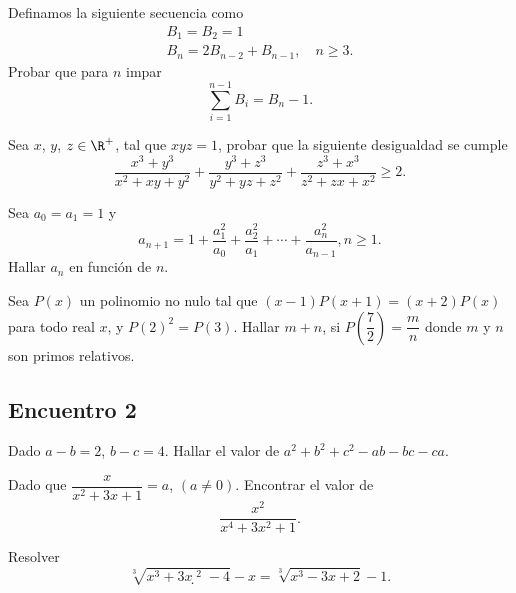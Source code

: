 \begin{section-problem}
    Definamos la siguiente secuencia como
    \begin{gather*}
        B_1 = B_2 = 1\\
        B_n = 2 B_{n - 2} + B_{n - 1}, \quad n \geq 3.
    \end{gather*}
    Probar que para $n$ impar
    \[\sum_{i = 1}^{n - 1} B_i = B_n - 1.\]
\end{section-problem}

\begin{section-problem}
    Sea $x$, $y$, $z \in \R^+$, tal que $xyz = 1$, probar que la siguiente desigualdad se cumple
    \[\frac{x^3 + y^3}{x^2 + xy + y^2} + \frac{y^3 + z^3}{y^2 + yz + z^2} + \frac{z^3 + x^3}{z^2 + zx + x^2} \geq 2.\]
\end{section-problem}

\begin{section-problem}
    Sea $a_0 = a_1 = 1$ y
    \[a_{n + 1} = 1 + \frac{a^2_1}{a_0} + \frac{a^2_2}{a_1} + \cdots + \frac{a^2_n}{a_{n - 1}}, n \geq 1.\]
    Hallar $a_n$ en función de $n$.
\end{section-problem}

\begin{section-problem}
    Sea $P(x)$ un polinomio no nulo tal que $(x - 1)P(x + 1) = (x + 2)P(x)$ para todo real $x$, y $P(2)^2 = P(3)$.
    Hallar $m + n$, si $P\left(\dfrac{7}{2}\right) = \dfrac{m}{n}$ donde $m$ y $n$ son primos relativos.
\end{section-problem}





\subsection{Encuentro 2}

\begin{section-problem}
    Dado $a - b = 2$, $b - c = 4$.
    Hallar el valor de $a^2 + b^2 + c^2 - ab - bc - ca$.
\end{section-problem}

\begin{section-problem}
    Dado que $\dfrac{x}{x^2 + 3x + 1} = a$, $(a \neq 0)$.
    Encontrar el valor de
    \[\frac{x^2}{x^4 + 3x^2 + 1}.\]
\end{section-problem}

\begin{section-problem}
    Resolver
    \[\sqrt[3]{x^3 + 3x̣^2 - 4} - x = \sqrt[3]{x^3 - 3x + 2} - 1.\]
\end{section-problem}

